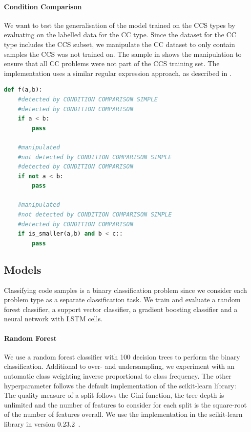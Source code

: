     \paragraph{Condition Comparison}\label{par:manipulation_condition_comparison}
We want to test the generalisation of the model trained on the CCS types by evaluating on the labelled data for the CC type. 
Since the dataset for the CC type includes the CCS subset, we manipulate the CC dataset to only contain samples the CCS was not trained on. The sample in  shows the manipulation to ensure that all CC problems were not part of the CCS training set. The implementation uses a similar regular expression approach, as described in .

\begin{lstlisting}[float=t, language=Python, label=lst:conidtion_comparison_modified, caption={Sample statements for the difference between the two analysis plugins CC and CCS.  }]
    def f(a,b):
    #detected by CONDITION COMPARISON SIMPLE
    #detected by CONDITION COMPARISON
    if a < b:
        pass 

    #manipulated
    #not detected by CONDITION COMPARISON SIMPLE
    #detected by CONDITION COMPARISON
    if not a < b:
        pass 

    #manipulated
    #not detected by CONDITION COMPARISON SIMPLE
    #detected by CONDITION COMPARISON
    if is_smaller(a,b) and b < c::
        pass \end{lstlisting}

\subsection{Models}
Classifying code samples is a binary classification problem since we consider each problem type as a separate classification task. We train and evaluate a random forest classifier, a support vector classifier, a gradient boosting classifier and a neural network with LSTM cells.

\paragraph{Random Forest}
We use a random forest classifier with 100 decision trees to perform the binary classification. Additional to over- and undersampling, we experiment with an automatic class weighting inverse proportional to class frequency. The other hyperparameter follows the default implementation of the scikit-learn library: The quality measure of a split follows the Gini function, the tree depth is unlimited and the number of features to consider for each split is the square-root of the number of features overall. We use the implementation in the scikit-learn library in version 0.23.2~\cite{scikit-learn}.
